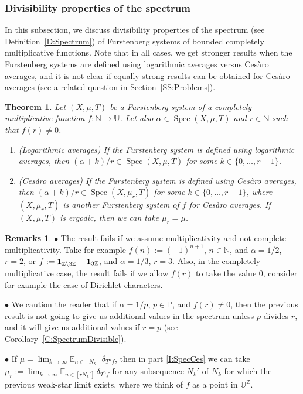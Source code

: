 \documentclass[11pt]{amsart}
\newtheorem{theorem}[lemma]{Theorem}
\theoremstyle{definition}
\newtheorem*{remarks}{Remarks}
\newcommand{\E}{{\mathbb E}}
\newcommand{\N}{{\mathbb N}}
\renewcommand{\P}{{\mathbb P}}
\newcommand{\Z}{{\mathbb Z}}
\newcommand{\U}{{\mathbb U}}
\DeclareMathOperator{\spec}{Spec}
\begin{document}
 \subsubsection{Divisibility properties of the spectrum} \label{SS:divisibility}
 In this subsection, we discuss divisibility properties of the spectrum (see Definition~\ref{D:Spectrum}) of Furstenberg systems of bounded completely multiplicative functions.  Note that in all cases, we get stronger results  when the Furstenberg systems are defined using logarithmic  averages versus Ces\`aro averages, and it is not clear if equally strong results can be obtained for Ces\`aro averages (see a related question in Section~\ref{SS:Problems}).
  \begin{theorem}\label{T:SpectrumDivisible}
 	Let  $(X,\mu, T)$ be a Furstenberg system of  a completely multiplicative function $f\colon\N \to \U$. Let also  $\alpha\in \spec(X,\mu,T)$  and $r\in \N$ such that  $f(r)\neq 0$.
 	\begin{enumerate}
 	\item\label{I:Sdiv1}(Logarithmic averages)  If the Furstenberg system is defined using logarithmic averages, then
 	$(\alpha+k)/r\in \spec(X,\mu,T)$  for some $k\in \{0,\ldots, r-1\}$.
 	
 	\smallskip
 	
 	\item\label{I:SpecCes}(Ces\`aro averages) If the Furstenberg system is defined using Ces\`aro averages, then
 	$(\alpha+k)/r\in \spec(X,\mu_r,T)$ for some $k\in \{0,\ldots, r-1\}$, where $(X,\mu_r,T)$ is another Furstenberg system of $f$ for Ces\`aro averages.
 	If $(X,\mu,T)$ is ergodic, then we can take $\mu_r=\mu$.
\end{enumerate}
 \end{theorem}
 \begin{remarks}
 $\bullet$ 	The result fails if we assume multiplicativity and not complete multiplicativity.
 Take for example $f(n):=(-1)^{n+1}$, $n\in \N$, and $\alpha=1/2$, $r=2$, or  $f:={\bf 1}_{\Z\setminus 3\Z}- {\bf 1}_{3\Z}$, and $\alpha=1/3$, $r=3$.
 Also, in the completely multiplicative case, the result fails if we allow $f(r)$ to take the value $0$, consider for example the case of Dirichlet characters.

 $\bullet$ We caution the reader that if $\alpha=1/p$, $p\in \P$,  and  $f(r)\neq 0$, then the previous result is not going to give us additional values in the spectrum unless $p$ divides $r$, and it will give us additional values if  $r=p$ (see Corollary~\ref{C:SpectrumDivisible}).
 	
 	
$\bullet$ If $\mu=\lim_{k\to\infty}\E_{n\in[N_k]}\, \delta_{T^nf}$, then in part \eqref{I:SpecCes}
we can take   $\mu_r:=\lim_{k\to\infty}\E_{n\in[rN_k']}\, \delta_{T^nf}$ for any subsequence  $N_k'$ of $N_k$ for which the previous weak-star limit exists, where we think of $f$ as a point in $\U^\Z$.
\end{remarks}
\end{document}
